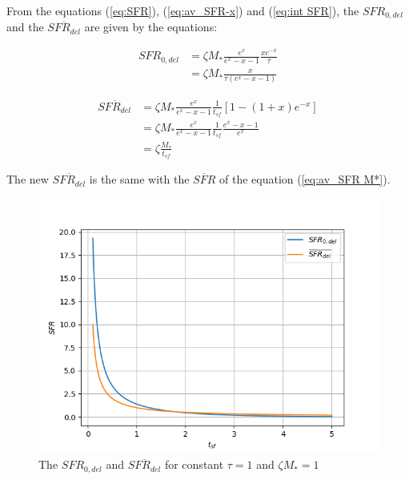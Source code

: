 \documentclass[a4paper,twocolumn]{article}
\begin{document}
From the equations (\ref{eq:SFR}), (\ref{eq:av_SFR-x}) and (\ref{eq:int SFR}), the \(SFR_{0,del}\) and the \(\overline{SFR_{del}}\) are given by the equations:

\begin{equation} \label{eq:SFR final}
\begin{align}
SFR_{0,del}&=\zeta M_*\frac{e^x}{e^x-x-1}\frac{xe^{-x}}{\tau}\\
          &=\zeta M_*\frac{x}{\tau(e^x-x-1)}
\end{align}
\end{equation}


\begin{equation}\label{eq:av_SFR-x final}
\begin{align}
\overline{SFR_{del}}&=\zeta M_*\frac{e^x}{e^x-x-1}\frac{1}{t_{sf}}[1-(1+x)e^{-x}]\\
                   &=\zeta M_*\frac{e^x}{e^x-x-1}\frac{1}{t_{sf}}\frac{e^x-x-1}{e^x}\\
                   &=\zeta \frac{M_*}{t_{sf}}
\end{align}
\end{equation}

The new \(\overline{SFR_{del}}\) is the same with the \(\overline{SFR}\) of the equation (\ref{eq:av_SFR M*}).

\begin{figure}[!htpb]
\centering
\includegraphics[width=.9\linewidth]{./figs/SFR_avSFR.png}
\caption{\label{fig:The $SFR_{0,del}$ and $\overline{SFR_{del}}$ for constant $\tau=1$ and $\zeta M_*=1$}The \(SFR_{0,del}\) and \(\overline{SFR_{del}}\) for constant \(\tau=1\) and \(\zeta M_*=1\)}
\end{figure}
\end{document}
